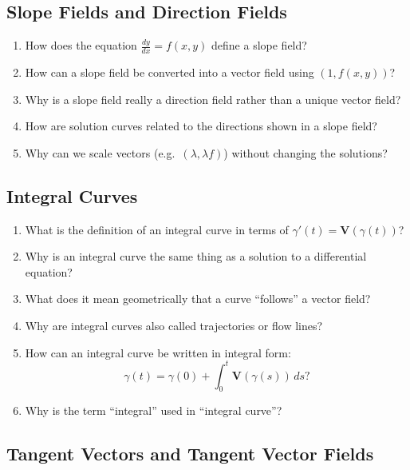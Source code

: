 \subsection{Slope Fields and Direction Fields}

\begin{enumerate}[resume]
  \item How does the equation \(\frac{dy}{dx}= f(x,y)\) define a slope field?
  \item How can a slope field be converted into a vector field using \((1, f(x,y))\)?
  \item Why is a slope field really a direction field rather than a unique vector field?
  \item How are solution curves related to the directions shown in a slope field?
  \item Why can we scale vectors (e.g.\ \((\lambda, \lambda f)\)) without changing the solutions?
\end{enumerate}

\subsection{Integral Curves}

\begin{enumerate}[resume]
  \item What is the definition of an integral curve in terms of \(\gamma'(t) = \mathbf{V}(\gamma(t))\)?
  \item Why is an integral curve the same thing as a solution to a differential equation?
  \item What does it mean geometrically that a curve ``follows'' a vector field?
  \item Why are integral curves also called trajectories or flow lines?
  \item How can an integral curve be written in integral form:
    \[ \gamma(t) = \gamma(0) + \int_{0}^{t} \mathbf{V}(\gamma(s))\,ds ? \]
  \item Why is the term ``integral'' used in ``integral curve''?
\end{enumerate}

\subsection{Tangent Vectors and Tangent Vector Fields}

